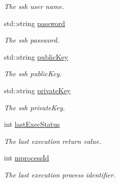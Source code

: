 \begin{DoxyCompactItemize}
\begin{DoxyCompactList}\small\item\em The ssh user name. \item\end{DoxyCompactList}\item 
\hypertarget{classSSHExec_af30f176105ad0e2c1b8fb3d398b4494a}{
std::string \hyperlink{classSSHExec_af30f176105ad0e2c1b8fb3d398b4494a}{password}}
\label{classSSHExec_af30f176105ad0e2c1b8fb3d398b4494a}

\begin{DoxyCompactList}\small\item\em The ssh password. \item\end{DoxyCompactList}\item 
\hypertarget{classSSHExec_acfbcc8d21597233b15b03e1616108a53}{
std::string \hyperlink{classSSHExec_acfbcc8d21597233b15b03e1616108a53}{publicKey}}
\label{classSSHExec_acfbcc8d21597233b15b03e1616108a53}

\begin{DoxyCompactList}\small\item\em The ssh publicKey. \item\end{DoxyCompactList}\item 
\hypertarget{classSSHExec_acccc21fc8f8bbc8abb6697dd542be0fe}{
std::string \hyperlink{classSSHExec_acccc21fc8f8bbc8abb6697dd542be0fe}{privateKey}}
\label{classSSHExec_acccc21fc8f8bbc8abb6697dd542be0fe}

\begin{DoxyCompactList}\small\item\em The ssh privateKey. \item\end{DoxyCompactList}\item 
\hypertarget{classSSHExec_a9d76ce6c5f0bf400a6b41ffb903c13db}{
int \hyperlink{classSSHExec_a9d76ce6c5f0bf400a6b41ffb903c13db}{lastExecStatus}}
\label{classSSHExec_a9d76ce6c5f0bf400a6b41ffb903c13db}

\begin{DoxyCompactList}\small\item\em The last execution return value. \item\end{DoxyCompactList}\item 
\hypertarget{classSSHExec_abd1c21bd60f464d4a7d8a34191295aad}{
int \hyperlink{classSSHExec_abd1c21bd60f464d4a7d8a34191295aad}{mprocessId}}
\label{classSSHExec_abd1c21bd60f464d4a7d8a34191295aad}

\begin{DoxyCompactList}\small\item\em The last execution process identifier. \item\end{DoxyCompactList}\end{DoxyCompactItemize}


